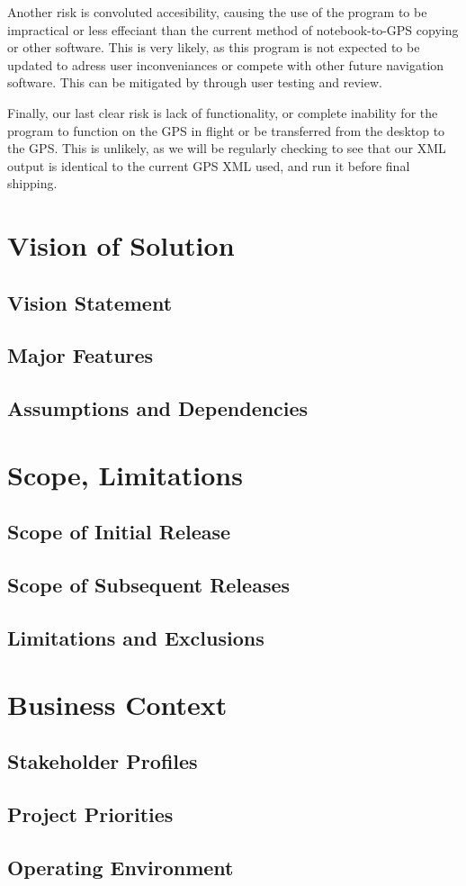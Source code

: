 \documentclass[12pt, letterpaper]{article}
\begin{document}
Another risk is convoluted accesibility, causing the use of the program to be impractical or less effeciant than the current method of notebook-to-GPS copying or other software. This is very likely, as this program is not expected to be updated to adress user inconveniances or compete with other future navigation software. This can be mitigated by through user testing and review. 

Finally, our last clear risk is lack of functionality, or complete inability for the program to function on the GPS in flight or be transferred from the desktop to the GPS. This is unlikely, as we will be regularly checking to see that our XML output is identical to the current GPS XML used, and run it before final shipping. 

\section{Vision of Solution}
\subsection{Vision Statement}
\subsection{Major Features}
\subsection{Assumptions and Dependencies}

\section{Scope, Limitations}
\subsection{Scope of Initial Release}
\subsection{Scope of Subsequent Releases}
\subsection{Limitations and Exclusions}

\section{Business Context}
\subsection{Stakeholder Profiles}
\subsection{Project Priorities}
\subsection{Operating Environment}

{}

\end{document}
